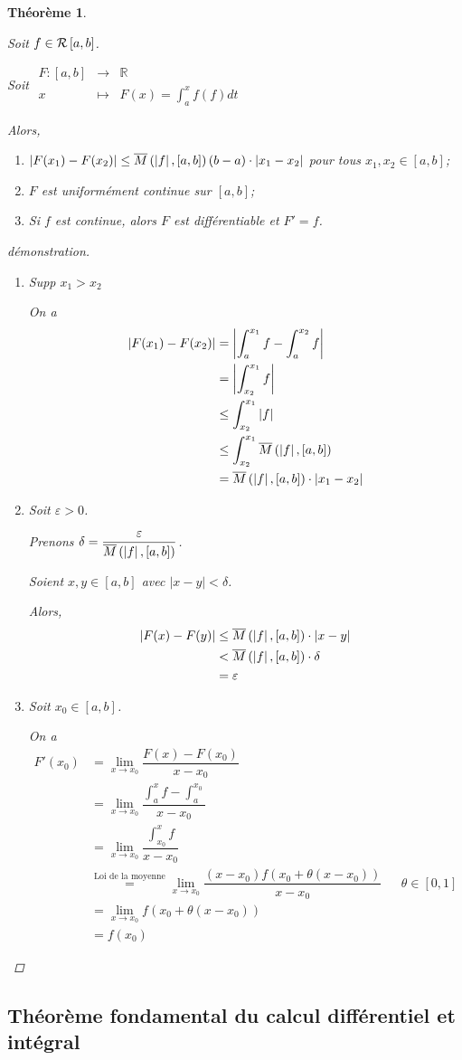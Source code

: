 \documentclass{report}
\newcommand*{\abs}[1]{\left| #1 \right|}
\newcommand*{\eps}{\varepsilon}
\newcommand*{\reels}{\mathbb{R}}
\newtheorem*{thm}{Th\'eor\`eme}
\theoremstyle{definition}
\theoremstyle{remark}
\begin{document}
	\begin{thm}
		~

		Soit $f \in \riemann$.

		Soit
		$\begin{array}{rcl}
			F:[a,b]&\to&\reels\\
			x&\mapsto&F(x) = \displaystyle\int_{a}^{x}f(f) dt
		\end{array}$

		Alors,
		\begin{enumerate}[label=\alph*)]
			\item $\abs{F(x_1)-F(x_2)} \leq \msup{\abs{f}}(b-a) \cdot \abs{x_1-x_2}$ pour tous $x_1,x_2 \in [a,b]$;
			\item $F$ est uniform\'ement continue sur $[a,b]$;
			\item Si $f$ est continue, alors $F$ est diff\'erentiable et $F'=f$.
		\end{enumerate}
		\begin{proof}[d\'emonstration]~

			\begin{enumerate}[label=\alph*)]
				\item Supp $x_1>x_2$

				On a
				\begin{align*}
					\abs{F(x_1)-F(x_2)}&= \abs{\int_{a}^{x_1}f - \int_{a}^{x_2}f}\\
					&= \abs{\int_{x_2}^{x_1}f}\\
					&\leq \int_{x_2}^{x_1}\abs{f}\\
					&\leq \int_{x_2}^{x_1}\msup{\abs{f}}\\
					&= \msup{\abs{f}} \cdot \abs{x_1-x_2}
				\end{align*}
				\item Soit $\eps>0$.

				Prenons $\delta = \dfrac{\eps}{\msup{\abs{f}}}$.

				Soient $x,y \in [a,b]$ avec $\abs{x-y}<\delta$.

				Alors,
				\begin{align*}
					\abs{F(x)-F(y)}&\leq \msup{\abs{f}} \cdot \abs{x-y}\\
					&< \msup{\abs{f}} \cdot \delta\\
					&= \eps
				\end{align*}
				\item Soit $x_0 \in [a,b]$.

				On a
				\begin{align*}
					F'(x_0)&= \lim_{x \to x_0}\dfrac{F(x)-F(x_0)}{x-x_0}\\
					&= \lim_{x \to x_0}\dfrac{\int_{a}^{x}f - \int_{a}^{x_0}}{x-x_0}\\
					&= \lim_{x \to x_0}\dfrac{\int_{x_0}^{x}f}{x-x_0}\\
					&\overset{\text{Loi de la moyenne}}{=} \lim_{x \to x_0}\dfrac{(x-x_0)f(x_0+\theta(x-x_0))}{x-x_0}&&\theta \in [0,1]\\
					&= \lim_{x \to x_0}f(x_0+\theta(x-x_0))\\
					&= f(x_0)
				\end{align*}
			\end{enumerate}
		\end{proof}
	\end{thm}

	\subsection{Th\'eor\`eme fondamental du calcul diff\'erentiel et int\'egral}
\end{document}
